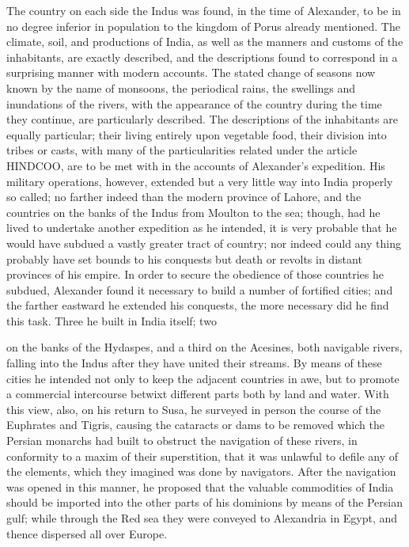 \documentclass{article}
\begin{document}
The country on each side the Indus was found, in the time of Alexander, to be in no degree inferior in population to the kingdom of Porus already mentioned. The climate, soil, and productions of India, as well as the manners and customs of the inhabitants, are exactly described, and the descriptions found to correspond in a surprising manner with modern accounts. The stated change of seasons now known by the name of monsoons, the periodical rains, the swellings and inundations of the rivers, with the appearance of the country during the time they continue, are particularly described. The descriptions of the inhabitants are equally particular; their living entirely upon vegetable food, their division into tribes or casts, with many of the particularities related under the article HINDCOO, are to be met with in the accounts of Alexander's expedition. His military operations, however, extended but a very little way into India properly so called; no farther indeed than the modern province of Lahore, and the countries on the banks of the Indus from Moulton to the sea; though, had he lived to undertake another expedition as he intended, it is very probable that he would have subdued a vastly greater tract of country; nor indeed could any thing probably have set bounds to his conquests but death or revolts in distant provinces of his empire. In order to secure the obedience of those countries he subdued, Alexander found it necessary to build a number of fortified cities; and the farther eastward he extended his conquests, the more necessary did he find this task. Three he built in India itself; two

on the banks of the Hydaspes, and a third on the Acesines, both navigable rivers, falling into the Indus after they have united their streams. By means of these cities he intended not only to keep the adjacent countries in awe, but to promote a commercial intercourse betwixt different parts both by land and water. With this view, also, on his return to Susa, he surveyed in person the course of the Euphrates and Tigris, causing the cataracts or dams to be removed which the Persian monarchs had built to obstruct the navigation of these rivers, in conformity to a maxim of their superstition, that it was unlawful to defile any of the elements, which they imagined was done by navigators. After the navigation was opened in this manner, he proposed that the valuable commodities of India should be imported into the other parts of his dominions by means of the Persian gulf; while through the Red sea they were conveyed to Alexandria in Egypt, and thence dispersed all over Europe.
\end{document}

